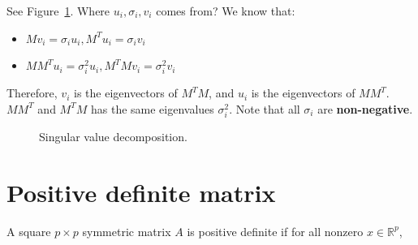  See Figure~\ref{fig:svd_mar}. 
    Where $u_i, \sigma_i, v_i$ comes from? We know that:
    \begin{itemize}
        \item $Mv_i = \sigma_i u_i, M^T u_i = \sigma_i v_i$
        \item $M M^T u_i = \sigma_i^2 u_i, M^T M v_i = \sigma_i^2 v_i$
    \end{itemize}
    Therefore, $v_i$ is the eigenvectors of $M^T M$, and $u_i$ is the eigenvectors
    of $M M^T$. $MM^T$ and $M^TM$ has the same eigenvalues $\sigma_i^2$.  Note
    that all $\sigma_i$ are \textbf{non-negative}.

\begin{figure}[H]
    \caption{Singular value decomposition.}
    \label{fig:svd_mar}
\end{figure}

\section{Positive definite matrix }
\vspace{0.5cm}
\begin{definition}
    A square $p \times p$ symmetric matrix $A$ is positive definite if for all
    nonzero $x \in \mathbb{R}^p$,
\end{definition}

